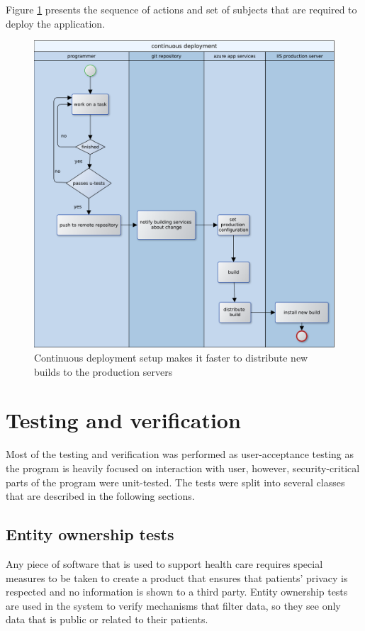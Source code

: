 \documentclass[12pt, twoside, openany]{report}
\theoremstyle{definition}
\begin{document}
Figure \ref{fig:continuous-deployment} presents the sequence of actions and set of subjects that are required to deploy the application.
\begin{figure}
	\centering
	\includegraphics[width=\linewidth]{continuous-deployment}
	\caption{Continuous deployment setup makes it faster to distribute new builds to the production servers
		\label{fig:continuous-deployment}
	}
\end{figure}

\chapter{Testing and verification}
Most of the testing and verification was performed as user-acceptance testing as the program is heavily focused on interaction with user, however, security-critical parts of the program were unit-tested.
The tests were split into several classes that are described in the following sections. 

\section{Entity ownership tests}
Any piece of software that is  used to support health care requires special measures to be taken to create a product that ensures that patients' privacy is respected and no information is shown to a third party. Entity ownership tests are used in the system to verify mechanisms that filter data, so they see only data that is public or related to their patients. 
\end{document}
